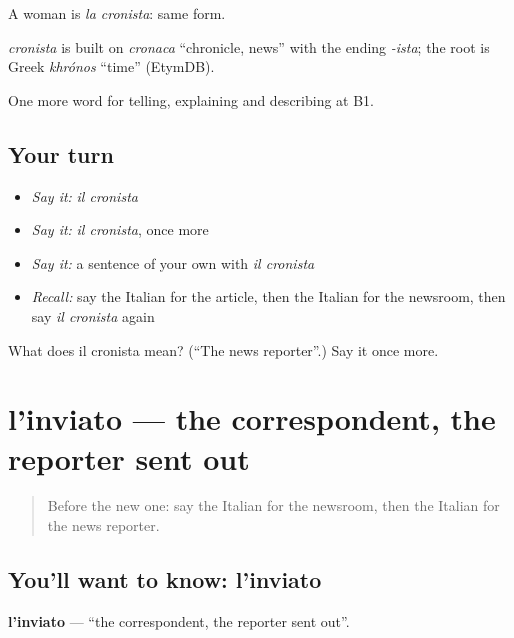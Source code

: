 A woman is \emph{la cronista}: same form.

\begin{cousinweb}
\emph{cronista} is built on \emph{cronaca} \textquotedblleft{}chronicle, news\textquotedblright{} with the ending \emph{-ista}; the root is Greek \emph{khrónos} \textquotedblleft{}time\textquotedblright{} (EtymDB).
\end{cousinweb}

\begin{grammarlens}[title={What you've built}]
One more word for telling, explaining and describing at B1.
\end{grammarlens}

\subsection*{Your turn}
\begin{itemize}
\raggedright
  \item \emph{Say it:} \emph{il cronista}
  \item \emph{Say it:} \emph{il cronista}, once more
  \item \emph{Say it:} a sentence of your own with \emph{il cronista}
  \item \emph{Recall:} say the Italian for the article, then the Italian for the newsroom, then say \emph{il cronista} again
\end{itemize}

\begin{tcolorbox}[breakable,colback=teal!4,colframe=teal!35!black,title={Before you move on}]
What does il cronista mean? (\textquotedblleft{}The news reporter\textquotedblright{}.) Say it once more.
\end{tcolorbox}
\section[l'inviato]{l'inviato — the correspondent, the reporter sent out}

\label{lesson:IT-C283-inviato}



\begin{quote}
Before the new one: say the Italian for the newsroom, then the Italian for the news reporter.
\end{quote}

\subsection*{You'll want to know: l'inviato}
\textbf{l'inviato} — \textquotedblleft{}the correspondent, the reporter sent out\textquotedblright{}.

